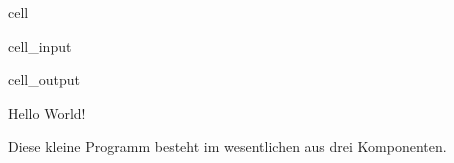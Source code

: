 \documentclass[letterpaper,10pt,english]{jupyterBook}
\begin{document}
\begin{sphinxuseclass}{cell}\begin{sphinxVerbatimInput}

\begin{sphinxuseclass}{cell_input}
\begin{sphinxVerbatim}[commandchars=\\\{\}]
 

\end{sphinxVerbatim}

\end{sphinxuseclass}\end{sphinxVerbatimInput}
\begin{sphinxVerbatimOutput}

\begin{sphinxuseclass}{cell_output}
\begin{sphinxVerbatim}[commandchars=\\\{\}]
Hello World!
\end{sphinxVerbatim}

\end{sphinxuseclass}\end{sphinxVerbatimOutput}

\end{sphinxuseclass}
\sphinxAtStartPar
Diese kleine Programm besteht im wesentlichen aus drei Komponenten.
\end{document}
